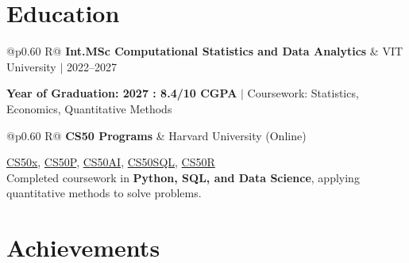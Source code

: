 \documentclass[a4paper,10pt]{article}
\newcommand{\ulink}[2]{\href{#1}{#2}}
\newcommand{\subheading}[1]{{\color[HTML]{0A0A0A}\fontsize{12}{14}\selectfont\bfseries #1}}
\newcommand{\meta}[1]{{\color[HTML]{5C5C5C}\fontsize{10.5}{12.5}\selectfont #1}}
\begin{document}
\section{Education}
\vspace{2pt}

\begin{tabularx}{\linewidth}{@{}p{0.60\linewidth} R@{}}
\subheading{Int.MSc Computational Statistics and Data Analytics} & \meta{VIT University $|$ 2022--2027}
\end{tabularx}
{\color[HTML]{3A3A3A}\fontsize{11}{14}\selectfont \textbf{Year of Graduation: 2027 : 8.4/10 CGPA} $|$ Coursework: Statistics, Economics, Quantitative Methods}

\begin{tabularx}{\linewidth}{@{}p{0.60\linewidth} R@{}}
\subheading{CS50 Programs} & \meta{Harvard University (Online)}
\end{tabularx}
{\color[HTML]{3A3A3A}\fontsize{11}{14}\selectfont \ulink{https://cs50.harvard.edu/certificates/b14b78df-e05c-413e-a607-1dd27303053a}{CS50x}, \ulink{https://cs50.harvard.edu/certificates/32477052-9db4-49c4-a5a4-d7e58429ca2c}{CS50P}, \ulink{https://cs50.harvard.edu/certificates/9cdb4d4a-1250-4f8e-9fd7-191864e0f919}{CS50AI}, \ulink{https://cs50.harvard.edu/certificates/bc486f24-f085-4e61-8536-80940b97a1b9}{CS50SQL}, \ulink{https://cs50.harvard.edu/certificates/666838e6-a053-4d82-b179-a60fe745fd84}{CS50R} \\[2pt]
Completed coursework in \textbf{Python, SQL, and Data Science}, applying quantitative methods to solve problems.}

\section{Achievements}
\vspace{2pt}
\end{document}
